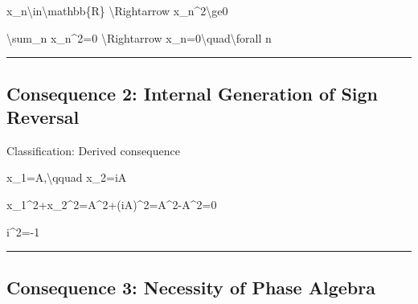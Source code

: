 \documentclass[
  a4paper,
]{article}
\newenvironment{Shaded}{}{}
\newcommand{\NormalTok}[1]{#1}
\begin{document}
\begin{Shaded}
\begin{Highlighting}[]
\NormalTok{x\_n\textbackslash{}in\textbackslash{}mathbb\{R\}}
\NormalTok{\textbackslash{}Rightarrow}
\NormalTok{x\_n\^{}2\textbackslash{}ge0}
\end{Highlighting}
\end{Shaded}

\begin{Shaded}
\begin{Highlighting}[]
\NormalTok{\textbackslash{}sum\_n x\_n\^{}2=0}
\NormalTok{\textbackslash{}Rightarrow}
\NormalTok{x\_n=0\textbackslash{}quad\textbackslash{}forall n}
\end{Highlighting}
\end{Shaded}

\begin{center}\rule{0.5\linewidth}{0.5pt}\end{center}

\subsection{Consequence 2: Internal Generation of Sign
Reversal}\label{consequence-2-internal-generation-of-sign-reversal}

Classification: Derived consequence

\begin{Shaded}
\begin{Highlighting}[]
\NormalTok{x\_1=A,\textbackslash{}qquad x\_2=iA}
\end{Highlighting}
\end{Shaded}

\begin{Shaded}
\begin{Highlighting}[]
\NormalTok{x\_1\^{}2+x\_2\^{}2=A\^{}2+(iA)\^{}2=A\^{}2{-}A\^{}2=0}
\end{Highlighting}
\end{Shaded}

\begin{Shaded}
\begin{Highlighting}[]
\NormalTok{i\^{}2={-}1}
\end{Highlighting}
\end{Shaded}

\begin{center}\rule{0.5\linewidth}{0.5pt}\end{center}

\subsection{Consequence 3: Necessity of Phase
Algebra}\label{consequence-3-necessity-of-phase-algebra}
\end{document}
